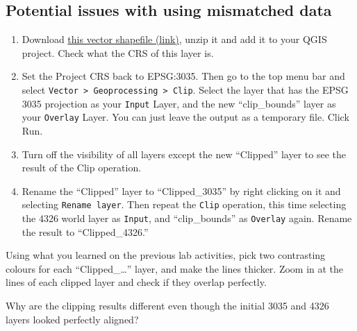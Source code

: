 \documentclass[
  letterpaper,
  DIV=11,
  numbers=noendperiod]{scrreprt}
\begin{document}
\subsection{Potential issues with using mismatched
data}\label{potential-issues-with-using-mismatched-data}

\begin{enumerate}
\def\labelenumi{(\arabic{enumi})}
\setcounter{enumi}{62}
\item
  Download
  \href{https://stir-my.sharepoint.com/:u:/g/personal/ala2_stir_ac_uk/EWwn64TEDgFCvLE-JUwjUZEBMRXc6NKtQ0KWHk769hI4Jw?e=iR9RdT}{this
  vector shapefile (link)}, unzip it and add it to your QGIS project.
  Check what the CRS of this layer is.
\item
  Set the Project CRS back to EPSG:3035. Then go to the top menu bar and
  select
  \texttt{Vector\ \textgreater{}\ Geoprocessing\ \textgreater{}\ Clip}.
  Select the layer that has the EPSG 3035 projection as your
  \texttt{Input} Layer, and the new ``clip\_bounds'' layer as your
  \texttt{Overlay} Layer. You can just leave the output as a temporary
  file. Click Run.
\item
  Turn off the visibility of all layers except the new ``Clipped'' layer
  to see the result of the Clip operation.
\item
  Rename the ``Clipped'' layer to ``Clipped\_3035'' by right clicking on
  it and selecting \texttt{Rename\ layer}. Then repeat the \texttt{Clip}
  operation, this time selecting the 4326 world layer as \texttt{Input},
  and ``clip\_bounds'' as \texttt{Overlay} again. Rename the result to
  ``Clipped\_4326.''
\end{enumerate}

Using what you learned on the previous lab activities, pick two
contrasting colours for each ``Clipped\_\ldots{}'' layer, and make the
lines thicker. Zoom in at the lines of each clipped layer and check if
they overlap perfectly.

\begin{tcolorbox}[enhanced jigsaw, breakable, toptitle=1mm, colback=white, left=2mm, leftrule=.75mm, titlerule=0mm, colframe=quarto-callout-important-color-frame, opacityback=0, title=\textcolor{quarto-callout-important-color}{\faExclamation}\hspace{0.5em}{Stop and Think}, toprule=.15mm, opacitybacktitle=0.6, bottomtitle=1mm, colbacktitle=quarto-callout-important-color!10!white, bottomrule=.15mm, coltitle=black, rightrule=.15mm, arc=.35mm]

Why are the clipping results different even though the initial 3035 and
4326 layers looked perfectly aligned?

\end{tcolorbox}
\end{document}
